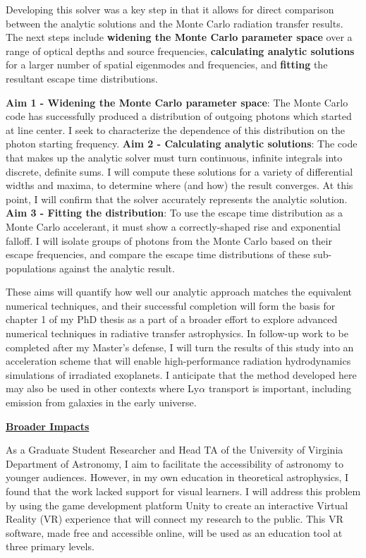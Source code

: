 \documentclass[11pt]{article}
\begin{document}
Developing this solver was a key step in that it allows for direct comparison between the analytic solutions and the Monte Carlo radiation transfer results. The next steps include \textbf{widening the Monte Carlo parameter space} over a range of optical depths and source frequencies, \textbf{calculating analytic solutions} for a larger number of spatial eigenmodes and frequencies, and \textbf{fitting} the resultant escape time distributions.

\textbf{Aim 1 - Widening the Monte Carlo parameter space}: The Monte Carlo code has successfully produced a distribution of outgoing photons which started at line center. I seek to characterize the dependence of this distribution on the photon starting frequency. \textbf{Aim 2 - Calculating analytic solutions}: The code that makes up the analytic solver must turn continuous, infinite integrals into discrete, definite sums. I will compute these solutions for a variety of differential widths and maxima, to determine where (and how) the result converges. At this point, I will confirm that the solver accurately represents the analytic solution. \textbf{Aim 3 - Fitting the distribution}: To use the escape time distribution as a Monte Carlo accelerant, it must show a correctly-shaped rise and exponential falloff. I will isolate groups of photons from the Monte Carlo based on their escape frequencies, and compare the escape time distributions of these sub-populations against the analytic result.

 These aims will quantify how well our analytic approach matches the equivalent numerical techniques, and their successful completion will form the basis for chapter 1 of my PhD thesis as a part of a broader effort to explore advanced numerical techniques in radiative transfer astrophysics. In follow-up work to be completed after my Master's defense, I will turn the results of this study into an acceleration scheme that will enable high-performance radiation hydrodynamics simulations of irradiated exoplanets. I anticipate that the method developed here may also be used in other contexts where Ly$\alpha$ transport is important, including emission from galaxies in the early universe.

\thispagestyle{empty}

\noindent \textbf{\underline{Broader Impacts}} 

As a Graduate Student Researcher and Head TA of the University of Virginia Department of Astronomy, I aim to facilitate the accessibility of astronomy to younger audiences. However, in my own education in theoretical astrophysics, I found that the work lacked support for visual learners. I will address this problem by using the game development platform Unity to create an interactive Virtual Reality (VR) experience that will connect my research to the public. This VR software, made free and accessible online, will be used as an education tool at three primary levels.
\end{document}
